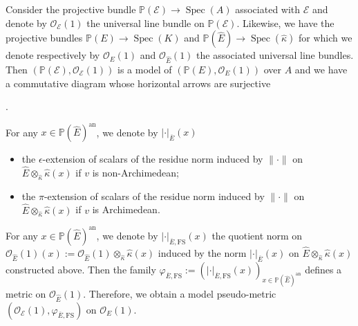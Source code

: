 \documentclass [11pt,reqno]{amsart}
\newcommand{\1}{\mathmybb{1}}
\def\cE{{\mathcal{E}}}
\def\cO{{\mathcal{O}}}
\def\an{\operatorname{an}}
\def\Spec{\operatorname{Spec}}
\begin{document}
Consider the projective bundle $\mathbb{P}(\cE) \to \Spec(A)$ associated with $\cE$ and denote by $\cO_{\cE}(1)$ the universal line bundle on $\mathbb{P}(\cE)$. Likewise, we have the projective bundles $\mathbb{P}(E)\to\Spec(K)$ and $\mathbb{P}(\widehat{E}) \to \Spec(\widehat{\kappa})$ for which we denote respectively by $\cO_{E}(1)$ and $\cO_{\widehat{E}}(1)$ the associated universal line bundles. Then $(\mathbb{P}(\cE),\cO_{\cE}(1))$ is a model of $(\mathbb{P}(E),\cO_{E}(1))$ over $A$ and we have a commutative diagram whose horizontal arrows are surjective
\begin{center}
.
\end{center}

For any $x\in \mathbb{P}(\widehat{E})^{\an}$, we denote by $|\cdot|_{\overline{E}}(x)$ 
\begin{itemize}
	\item the $\epsilon$-extension of scalars of the residue norm induced by $\|\cdot\|$ on $\widehat{E}\otimes_{\widehat{\kappa}}\widehat{\kappa}(x)$ if $v$ is non-Archimedean;
	\item the $\pi$-extension of scalars of the residue norm induced by $\|\cdot\|$ on $\widehat{E}\otimes_{\widehat{\kappa}}\widehat{\kappa}(x)$ if $v$ is Archimedean.
\end{itemize}

For any $x\in \mathbb{P}(\widehat{E})^{\an}$, we denote by $|\cdot|_{\overline{E},\mathrm{FS}}(x)$ the quotient norm on $\cO_{\widehat{E}}(1)(x) := \cO_{\widehat{E}}(1) \otimes_{\widehat{\kappa}} \widehat{\kappa}(x)$ induced by the norm $|\cdot|_{\overline{E}}(x)$ on $\widehat{E}\otimes_{\widehat{\kappa}} \widehat{\kappa}(x)$ constructed above. Then the family $\varphi_{\overline{E},\mathrm{FS}} := (|\cdot|_{\overline{E},\mathrm{FS}}(x))_{x\in \mathbb{P}(\widehat{E})^{\an}}$ defines a metric on $\cO_{\widehat{E}}(1)$. Therefore, we obtain a model pseudo-metric $(\cO_{\cE}(1),\varphi_{\overline{E},\mathrm{FS}})$ on $\cO_{E}(1)$.
\end{document}
